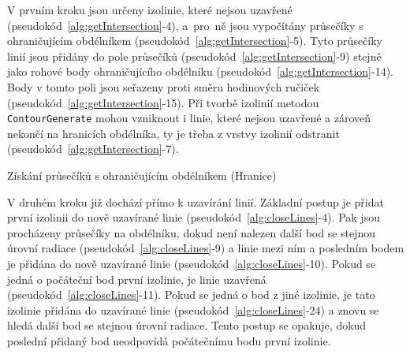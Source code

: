 V prvním kroku jsou určeny izolinie, které nejsou uzavřené
(pseudokód~\ref{alg:getIntersection}-4), a~pro~ně jsou vypočítány
průsečíky s ohraničujícím obdélníkem
(pseudokód~\ref{alg:getIntersection}-5). Tyto průsečíky linií jsou
přidány do pole průsečíků (pseudokód~\ref{alg:getIntersection}-9)
stejně jako rohové body ohraničujícího obdélníku
(pseudokód~\ref{alg:getIntersection}-14). Body v tomto poli jsou
seřazeny proti směru hodinových ručiček
(pseudokód~\ref{alg:getIntersection}-15). Při tvorbě izolinií metodou
\texttt{ContourGenerate} mohou vzniknout i linie, které nejsou
uzavřené a zároveň nekončí na hranicích obdélníka, ty je třeba z
vrstvy izolinií odstranit (pseudokód~\ref{alg:getIntersection}-7).

\begin{algorithm}
\caption{Získání průsečíků s ohraničujícím obdélníkem (Hranice)}
\label{alg:getIntersection}
    \begin{algorithmic}[1] 
			\ELSE
			\ENDIF	
		\ENDIF
	\ENDWHILE
    \end{algorithmic}
\end{algorithm}

V druhém kroku již dochází přímo k uzavírání linií. Základní postup je
přidat první izolinii do nově uzavírané linie
(pseudokód~\ref{alg:closeLines}-4). Pak jsou procházeny průsečíky na
obdélníku, dokud není nalezen další bod se stejnou úrovní radiace
(pseudokód~\ref{alg:closeLines}-9) a linie mezi ním a posledním bodem
je přidána do nově uzavírané linie
(pseudokód~\ref{alg:closeLines}-10). Pokud se jedná o počáteční bod
první izolinie, je linie uzavřená
(pseudokód~\ref{alg:closeLines}-11). Pokud se jedná o bod z jiné
izolinie, je tato izolinie přidána do uzavírané linie
(pseudokód~\ref{alg:closeLines}-24) a znovu se hledá další bod se
stejnou úrovní radiace. Tento postup se opakuje, dokud poslední
přidaný bod neodpovídá počátečnímu bodu první izolinie.


